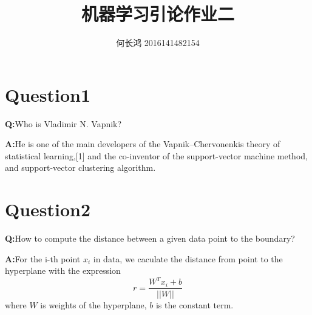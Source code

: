 \documentclass{xcumcmart}
\title{机器学习引论作业二}
\author{何长鸿 2016141482154}
\begin{document}
\renewcommand\arraystretch{2}
\maketitle
\section{Question1}
\textbf{Q:}Who is Vladimir N. Vapnik?\\
\par \textbf{A:}He is one of the main developers of the Vapnik–Chervonenkis theory of statistical learning,[1] and the co-inventor of the support-vector machine method, and support-vector clustering algorithm.

\section{Question2}
\textbf{Q:}How to compute the distance between a given data point to the boundary?\\
\par \textbf{A:}For the i-th point $x_i$ in data, we caculate the distance from point to the hyperplane with the expression $$r=\frac{W^Tx_i+b}{||W||}$$ where $W$ is weights of the hyperplane, $b$ is the constant term.
\end{document}
